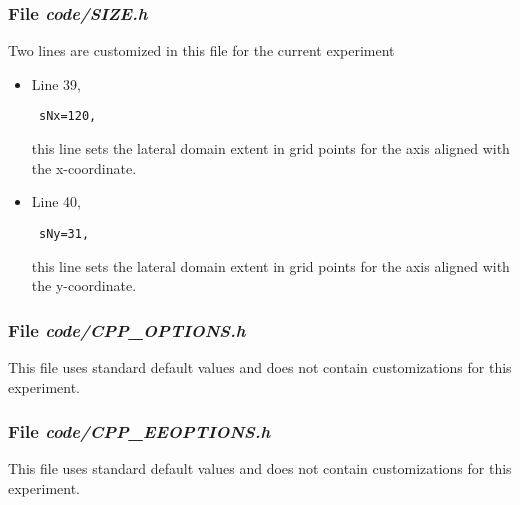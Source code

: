\subsubsection{File {\it code/SIZE.h}}

Two lines are customized in this file for the current experiment

\begin{itemize}

\item Line 39, 
\begin{verbatim} sNx=120, \end{verbatim} this line sets
the lateral domain extent in grid points for the
axis aligned with the x-coordinate.

\item Line 40, 
\begin{verbatim} sNy=31, \end{verbatim} this line sets
the lateral domain extent in grid points for the
axis aligned with the y-coordinate.

\end{itemize}

\begin{small}

\end{small}

\subsubsection{File {\it code/CPP\_OPTIONS.h}}

This file uses standard default values and does not contain
customizations for this experiment.


\subsubsection{File {\it code/CPP\_EEOPTIONS.h}}

This file uses standard default values and does not contain
customizations for this experiment.

